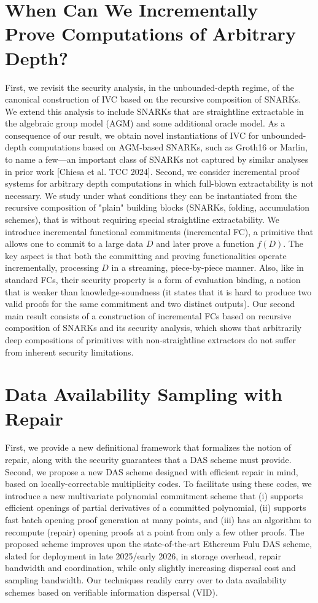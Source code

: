 \documentclass[11pt]{article}
\theoremstyle{definition}
\theoremstyle{remark}
\theoremstyle{plain}
\begin{document}
\section{\cite{cryptoeprint:2025/1413} When Can We Incrementally Prove Computations of Arbitrary Depth?}
First, we revisit the security analysis, in the unbounded-depth regime, of the canonical construction of IVC based on the recursive composition of SNARKs. We extend this analysis to include SNARKs that are straightline extractable in the algebraic group model (AGM) and some additional oracle model. As a consequence of our result, we obtain novel instantiations of IVC for unbounded-depth computations based on AGM-based SNARKs, such as Groth16 or Marlin, to name a few—an important class of SNARKs not captured by similar analyses in prior work [Chiesa et al. TCC 2024]. Second, we consider incremental proof systems for arbitrary depth computations in which full-blown extractability is not necessary. We study under what conditions they can be instantiated from the recursive composition of "plain" building blocks (SNARKs, folding, accumulation schemes), that is without requiring special straightline extractability. We introduce incremental functional commitments (incremental FC), a primitive that allows one to commit to a large data $D$ and later prove a function $f(D)$. The key aspect is that both the committing and proving functionalities operate incrementally, processing $D$ in a streaming, piece-by-piece manner. Also, like in standard FCs, their security property is a form of evaluation binding, a notion that is weaker than knowledge-soundness (it states that it is hard to produce two valid proofs for the same commitment and two distinct outputs). Our second main result consists of a construction of incremental FCs based on recursive composition of SNARKs and its security analysis, which shows that arbitrarily deep compositions of primitives with non-straightline extractors do not suffer from inherent security limitations.

\section{\cite{cryptoeprint:2025/1414} Data Availability Sampling with Repair}
First, we provide a new definitional framework that formalizes the notion of repair, along with the security guarantees that a DAS scheme must provide. Second, we propose a new DAS scheme designed with efficient repair in mind, based on locally-correctable multiplicity codes. To facilitate using these codes, we introduce a new multivariate polynomial commitment scheme that (i) supports efficient openings of partial derivatives of a committed polynomial, (ii) supports fast batch opening proof generation at many points, and (iii) has an algorithm to recompute (repair) opening proofs at a point from only a few other proofs. The proposed scheme improves upon the state-of-the-art Ethereum Fulu DAS scheme, slated for deployment in late 2025/early 2026, in storage overhead, repair bandwidth and coordination, while only slightly increasing dispersal cost and sampling bandwidth. Our techniques readily carry over to data availability schemes based on verifiable information dispersal (VID).
\end{document}

